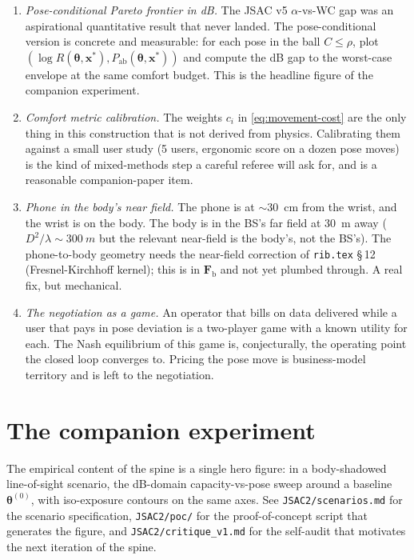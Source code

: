 \documentclass[11pt,a4paper]{article}
\theoremstyle{definition}
\newcommand{\Frib}{\mathbf{F}_{\mathrm{b}}}
\newcommand{\xvec}{\mathbf{x}}
\newcommand{\thetab}{\bm{\theta}}
\begin{document}
\begin{enumerate}[leftmargin=1.6em,itemsep=3pt]
control.
\item \emph{Pose-conditional Pareto frontier in dB.}  The JSAC v5
$\alpha$-vs-WC gap was an aspirational quantitative result that
never landed.  The pose-conditional version is concrete and
measurable: for each pose in the ball $C\le\rho$, plot
$(\log R(\thetab,\xvec^*),P_{\mathrm{ab}}(\thetab,\xvec^*))$ and
compute the dB gap to the worst-case envelope at the same comfort
budget.  This is the headline figure of the companion experiment.
\item \emph{Comfort metric calibration.}  The
weights $c_i$ in \eqref{eq:movement-cost} are the only thing in
this construction that is not derived from physics.  Calibrating
them against a small user study (5 users, ergonomic score on a
dozen pose moves) is the kind of mixed-methods step a careful
referee will ask for, and is a reasonable companion-paper item.
\item \emph{Phone in the body's near field.}  The phone is at
$\sim$\SI{30}{cm} from the wrist, and the wrist is on the body.
The body is in the BS's far field at \SI{30}{m} away
($D^2/\lambda\sim\SI{300}{m}$ but the relevant near-field is the
body's, not the BS's).  The phone-to-body geometry needs the
near-field correction of \texttt{rib.tex} \S\,12 (Fresnel-Kirchhoff
kernel); this is in $\Frib$ and not yet plumbed through.  A real
fix, but mechanical.
\item \emph{The negotiation as a game.}  An operator that bills
on data delivered while a user that pays in pose deviation is a
two-player game with a known utility for each.  The Nash
equilibrium of this game is, conjecturally, the operating point
the closed loop converges to.  Pricing the pose move is
business-model territory and is left to the negotiation.
\end{enumerate}

\section{The companion experiment}\label{sec:comp}

The empirical content of the spine is a single hero figure: in a
body-shadowed line-of-sight scenario, the dB-domain capacity-vs-pose
sweep around a baseline $\thetab^{(0)}$, with iso-exposure contours
on the same axes.  See \texttt{JSAC2/scenarios.md} for the
scenario specification, \texttt{JSAC2/poc/} for the proof-of-concept
script that generates the figure, and \texttt{JSAC2/critique\_v1.md}
for the self-audit that motivates the next iteration of the spine.
\end{document}
